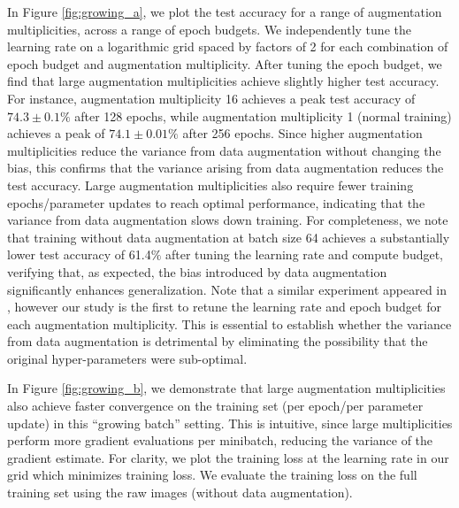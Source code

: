 \documentclass{article}
\begin{document}
In Figure \ref{fig:growing_a}, we plot the test accuracy for a range of augmentation multiplicities, across a range of epoch budgets. We independently tune the learning rate on a logarithmic grid spaced by factors of 2 for each combination of epoch budget and augmentation multiplicity. After tuning the epoch budget, we find that large augmentation multiplicities achieve slightly higher test accuracy. For instance, augmentation multiplicity 16 achieves a peak test accuracy of $74.3 \pm 0.1\%$ after 128 epochs, while augmentation multiplicity 1 (normal training) achieves a peak of $74.1 \pm 0.01\%$ after 256 epochs. Since higher augmentation multiplicities reduce the variance from data augmentation without changing the bias, this confirms that the variance arising from data augmentation reduces the test accuracy. Large augmentation multiplicities also require fewer training epochs/parameter updates to reach optimal performance, indicating that the variance from data augmentation slows down training. For completeness, we note that training without data augmentation at batch size 64 achieves a substantially lower test accuracy of 61.4$\%$ after tuning the learning rate and compute budget, verifying that, as expected, the bias introduced by data augmentation significantly enhances generalization. 
Note that a similar experiment appeared in \citet{hoffer2019augment}, however our study is the first to retune the learning rate and epoch budget for each augmentation multiplicity. This is essential to establish whether the variance from data augmentation is detrimental by eliminating the possibility that the original hyper-parameters were sub-optimal.


In Figure \ref{fig:growing_b}, we demonstrate that large augmentation multiplicities also achieve faster convergence on the training set (per epoch/per parameter update) in this ``growing batch'' setting. This is intuitive, since large multiplicities perform more gradient evaluations per minibatch, reducing the variance of the gradient estimate. For clarity, we plot the training loss at the learning rate in our grid which minimizes training loss. We evaluate the training loss on the full training set using the raw images (without data augmentation). 
\end{document}
